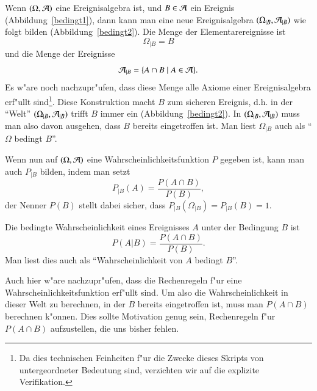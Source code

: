 Wenn $(\Omega, {\cal A})$ eine Ereignisalgebra ist, und 
$B\in{\cal A}$ ein Ereignis (Abbildung~\ref{bedingt1}),
dann kann man eine neue Ereignisalgebra
$(\Omega_{|B}, {\cal A}_{|B})$ wie folgt bilden (Abbildung~\ref{bedingt2}).
Die Menge der Elementarereignisse ist
\[
\Omega_{|B}=B
\]
und die Menge der Ereignisse
\[
{\cal A}_{|B}=\{A\cap B\;|\; A\in{\cal A}\}.
\]
Es w"are noch nachzupr"ufen, dass diese Menge alle Axiome einer
Ereignisalgebra erf"ullt sind\footnote{Da dies technischen Feinheiten 
f"ur die Zwecke dieses Skripts von untergeordneter Bedeutung sind, verzichten
wir auf die explizite Verifikation.}.
Diese Konstruktion macht $B$ zum sicheren Ereignis, d.h. in der ``Welt''
$(\Omega_{|B},{\cal A}_{|B})$ trifft $B$ immer ein (Abbildung~\ref{bedingt2}).
In $(\Omega_{|B},{\cal A}_{|B})$ muss man also davon ausgehen, dass $B$
bereits eingetroffen ist.
Man liest $\Omega_{|B}$ auch als ``$\Omega$ bedingt $B$''.

Wenn nun auf $(\Omega, {\cal A})$ eine Wahrscheinlichkeitsfunktion $P$
gegeben ist, kann man auch $P_{|B}$ bilden, indem man setzt
\begin{equation*}
P_{|B}(A)=\frac{P(A\cap B)}{P(B)},
\end{equation*}
der Nenner $P(B)$ stellt dabei sicher, dass $P_{|B}(\Omega_{|B})=P_{|B}(B)=1$.

\begin{definition}
\label{def-bedingte-wahrscheinlichkeit}
Die bedingte Wahrscheinlichkeit eines Ereignisses $A$ unter der Bedingung
$B$ ist
\[
P(A|B)=\frac{P(A\cap B)}{P(B)}.
\]
Man liest dies auch als ``Wahrscheinlichkeit von $A$ bedingt $B$''.
\end{definition}

Auch hier w"are nachzupr"ufen, dass die Rechenregeln f"ur eine
Wahrscheinlichkeitsfunktion erf"ullt sind.
Um also die Wahrscheinlichkeit in dieser Welt zu berechnen,
in der $B$ bereits eingetroffen ist, 
muss man $P(A\cap B)$ berechnen k"onnen.
Dies sollte Motivation genug sein, Rechenregeln f"ur
$P(A\cap B)$ aufzustellen, die uns bisher fehlen.

